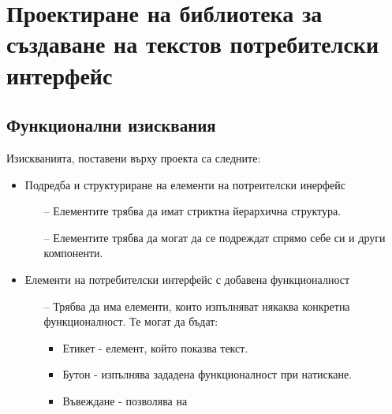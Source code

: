 \chapter{Проектиране на библиотека за създаване на текстов потребителски 
интерфейс}
\hfill

\section{Функционални изисквания}

        Изискванията, поставени върху проекта са следните:

        \begin{itemize}
                \item Подредба и структуриране на елементи на потреителски
                        инерфейс
                        \begin{itemize}
                                \item[--] Елементите трябва да имат стриктна 
                                        йерархична структура.
                                \item[--] Елементите трябва да могат да се
                                        подреждат спрямо себе си и други 
                                        компоненти.
                        \end{itemize}
                \item Елементи на потребителски интерфейс с добавена
                        функционалност
                        \begin{itemize}
                                \item[--] Трябва да има елементи, които
                                        изпълняват някаква конкретна
                                        функционалност. Те могат да бъдат:
                                        \begin{itemize}
                                                \item Етикет - елемент, който
                                                        показва текст. 
                                                \item Бутон - изпълнява
                                                        зададена функционалност
                                                        при натискане.
                                                \item Въвеждане - позволява на 

\end{itemize}
\end{itemize}
\end{itemize}
